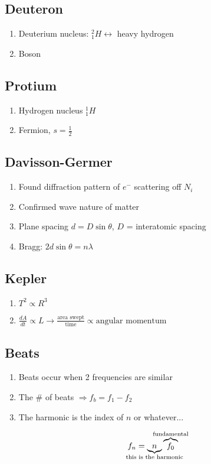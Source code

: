 \documentclass[10pt,a4paper]{article}
\begin{document}
\subsection{Deuteron}
\begin{enumerate}
    \item Deuterium nucleus: $^2_1H \leftrightarrow $ heavy hydrogen 
    \item Boson
\end{enumerate}

\subsection{Protium}
\begin{enumerate}
    \item Hydrogen nucleus $^1_1H$
    \item Fermion, $s=\frac{1}{2}$
\end{enumerate}

\subsection{Davisson-Germer}
\begin{enumerate}
    \item Found diffraction pattern of $e^-$ scattering off $N_i$
    \item Confirmed wave nature of matter
    \item Plane spacing  $d = D\sin \theta$, $D$ = interatomic spacing
    \item Bragg: $2d\sin \theta = n\lambda$
\end{enumerate}

\subsection{Kepler}
\begin{enumerate}
    \item $T^2 \propto R^3$
    \item $\frac{dA}{dt} \propto L \rightarrow \frac{\textrm{area swept}}{\textrm{time}} \propto \textrm{angular momentum}$
\end{enumerate}

\subsection{Beats}
\begin{enumerate}
    \item Beats occur when 2 frequencies are similar
    \item The \# of beats $\Rightarrow f_b = f_1 - f_2$ 
    \item The harmonic is the index of $n$ or whatever...
\end{enumerate}
\begin{equation}
 f_n = \underbrace{n}_{\mathclap{\textrm{this is the harmonic}}}\overbrace{f_0}^{\mathclap{\textrm{fundamental}}}
\end{equation}
\end{document}
